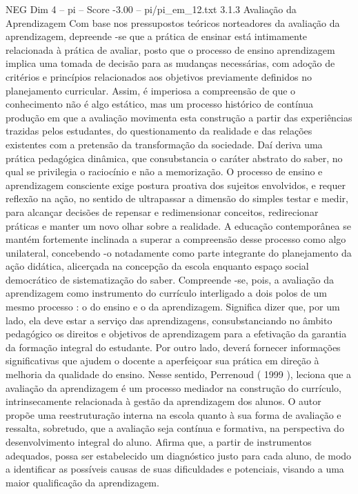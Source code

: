 \begin{textsample}{NEG Dim 4 – pi – Score -3.00 – pi/pi\_em\_12.txt}  \label{ex:f4_neg_162}
3.1.3 Avaliação da Aprendizagem Com base nos pressupostos teóricos norteadores da avaliação da aprendizagem, depreende -se que a prática de ensinar está intimamente relacionada à prática de avaliar, posto que o processo de ensino aprendizagem implica uma tomada de decisão para as mudanças necessárias, com adoção de critérios e princípios relacionados aos objetivos previamente definidos no planejamento curricular.
Assim, é imperiosa a compreensão de que o conhecimento não é algo estático, mas um processo histórico de contínua produção em que a avaliação movimenta esta construção a partir das experiências trazidas pelos estudantes, do questionamento da realidade e das relações existentes com a pretensão da transformação da sociedade.
Daí deriva uma prática pedagógica dinâmica, que consubstancia o caráter abstrato do saber, no qual se privilegia o raciocínio e não a memorização.
O processo de ensino e aprendizagem consciente exige postura proativa dos sujeitos envolvidos, e requer reflexão na ação, no sentido de ultrapassar a dimensão do simples testar e medir, para alcançar decisões de repensar e redimensionar conceitos, redirecionar práticas e manter um novo olhar sobre a realidade.
A educação contemporânea se mantém fortemente inclinada a superar a compreensão desse processo como algo unilateral, concebendo -o notadamente como parte integrante do planejamento da ação didática, alicerçada na concepção da escola enquanto espaço social democrático de sistematização do saber.
Compreende -se, pois, a avaliação da aprendizagem como instrumento do currículo interligado a dois polos de um mesmo processo : o do ensino e o da aprendizagem.
Significa dizer que, por um lado, ela deve estar a serviço das aprendizagens, consubstanciando no âmbito pedagógico os direitos e objetivos de aprendizagem para a efetivação da garantia da formação integral do estudante.
Por outro lado, deverá fornecer informações significativas que ajudem o docente a aperfeiçoar sua prática em direção à melhoria da qualidade do ensino.
Nesse sentido, Perrenoud ( 1999 ), leciona que a avaliação da aprendizagem é um processo mediador na construção do currículo, intrinsecamente relacionada à gestão da aprendizagem dos alunos.
O autor propõe uma reestruturação interna na escola quanto à sua forma de avaliação e ressalta, sobretudo, que a avaliação seja contínua e formativa, na perspectiva do desenvolvimento integral do aluno.
Afirma que, a partir de instrumentos adequados, possa ser estabelecido um diagnóstico justo para cada aluno, de modo a identificar as possíveis causas de suas dificuldades e potenciais, visando a uma maior qualificação da aprendizagem.

\end{textsample}
